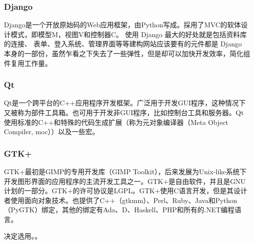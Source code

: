 \subsubsection{Django}
Django是一个开放原始码的Web应用框架，由Python写成。採用了MVC的软体设计模式，即模型M，视图V和控制器C。
使用 Django 最大的好处就是包括资料库的连接、 表单、登入系统、管理界面等等建构网站应该要有的元件都是 Django 本身的一部份，虽然乍看之下失去了一些弹性，但是却可以加快开发效率，简化组件复用工作量。

\subsubsection{Qt}
Qt是一个跨平台的C++应用程序开发框架。广泛用于开发GUI程序，这种情况下又被称为部件工具箱。也可用于开发非GUI程序，比如控制台工具和服务器。Qt使用标准的C++和特殊的代码生成扩展（称为元对象编译器（Meta Object Compiler, moc））以及一些宏。
\subsubsection{GTK+}
GTK+最初是GIMP的专用开发库（GIMP Toolkit），后来发展为Unix-like系统下开发图形界面的应用程序的主流开发工具之一。GTK+是自由软件，并且是GNU计划的一部分。GTK+的许可协议是LGPL。GTK+使用C语言开发，但是其设计者使用面向对象技术。也提供了C++（gtkmm）、Perl、Ruby、Java和Python（PyGTK）绑定，其他的绑定有Ada、D、Haskell、PHP和所有的.NET编程语言。

决定选用。。


